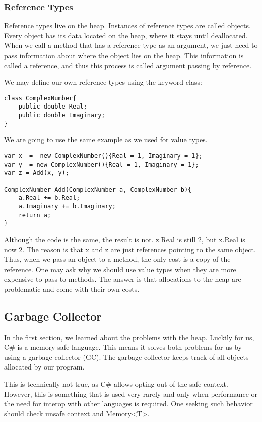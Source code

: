 \subsubsection{Reference Types}
Reference types live on the heap. Instances of reference types are called objects. Every object has its data located on the heap, where it stays until deallocated. When we call a method that has a reference type as an argument, we just need to pass information about where the object lies on the heap. This information is called a reference, and thus this process is called argument passing by reference.

We may define our own reference types using the keyword class:

\begin{lstlisting}
class ComplexNumber{
    public double Real;
    public double Imaginary;
}
\end{lstlisting}

We are going to use the same example as we used for value types.

\begin{lstlisting}
var x  =  new ComplexNumber(){Real = 1, Imaginary = 1};
var y  = new ComplexNumber(){Real = 1, Imaginary = 1};
var z = Add(x, y);

ComplexNumber Add(ComplexNumber a, ComplexNumber b){
    a.Real += b.Real;
    a.Imaginary += b.Imaginary;
    return a;
}
\end{lstlisting}

Although the code is the same, the result is not. z.Real is still 2, but x.Real is now 2. The reason is that x and z are just references pointing to the same object. Thus, when we pass an object to a method, the only cost is a copy of the reference. One may ask why we should use value types when they are more expensive to pass to methods. The answer is that allocations to the heap are problematic and come with their own costs.

\subsection{Garbage Collector}
In the first section, we learned about the problems with the heap. Luckily for us, C\# is a memory-safe language. This means it solves both problems for us by using a garbage collector (GC). The garbage collector keeps track of all objects allocated by our program.

\begin{rem}
    This is technically not true, as C\# allows opting out of the safe context. However, this is something that is used very rarely and only when performance or the need for interop with other languages is required. One seeking such behavior should check unsafe context and Memory<T>.
\end{rem}

